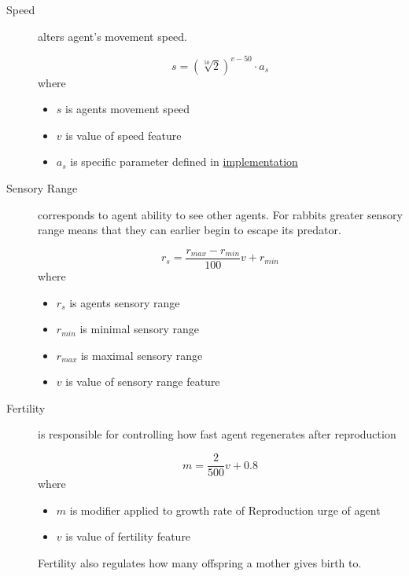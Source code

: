 \begin{description}
    \item[Speed] alters agent's movement speed.
    
    \begin{equation}
        s = (\sqrt[50]{2})^{v-50} \cdot a_s
    \end{equation}
    where
    \begin{itemize}
        \item $s$ is agents movement speed
        \item $v$ is value of speed feature
        \item $a_s$ is specific parameter defined in \hyperref[featuresNeedsStatesImplementation]{implementation}
    \end{itemize}
    
    \item[Sensory Range] corresponds to agent ability to see other agents. For rabbits greater sensory range means that they can earlier begin to escape its predator.
    
    \begin{equation}
        r_s = \frac{r_{max} - r_{min}}{100} v + r_{min}
    \end{equation}
    where
    \begin{itemize}
        \item $r_s$ is agents sensory range
        \item $r_{min}$ is minimal sensory range
        \item $r_{max}$ is maximal sensory range
        \item $v$ is value of sensory range feature
    \end{itemize}
    
    \item[Fertility] is responsible for controlling how fast agent regenerates after reproduction
    
    \begin{equation}
        m = \frac{2}{500} v + 0.8
    \end{equation}
    where
    \begin{itemize}
        \item $m$ is modifier applied to growth rate of Reproduction urge of agent
        \item $v$ is value of fertility feature
    \end{itemize}
    
    Fertility also regulates how many offspring a mother gives birth to.
    

\end{description}
